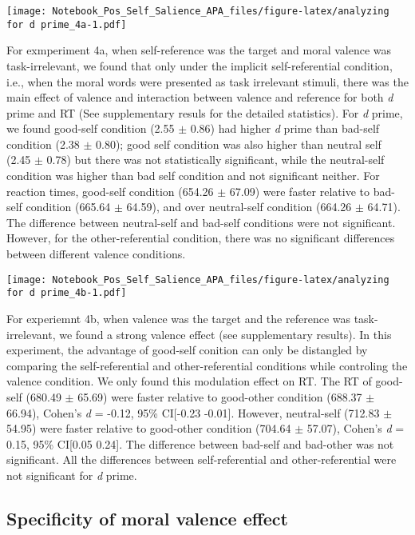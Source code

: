 \documentclass[
  man]{apa6}
\begin{document}
\texttt{[image: Notebook\_Pos\_Self\_Salience\_APA\_files/figure-latex/analyzing for d prime\_4a-1.pdf]}

For exmperiment 4a, when self-reference was the target and moral valence was task-irrelevant, we found that only under the implicit self-referential condition, i.e., when the moral words were presented as task irrelevant stimuli, there was the main effect of valence and interaction between valence and reference for both \emph{d} prime and RT (See supplementary resuls for the detailed statistics). For \emph{d} prime, we found good-self condition (2.55 \(\pm\) 0.86) had higher \emph{d} prime than bad-self condition (2.38 \(\pm\) 0.80); good self condition was also higher than neutral self (2.45 \(\pm\) 0.78) but there was not statistically significant, while the neutral-self condition was higher than bad self condition and not significant neither. For reaction times, good-self condition (654.26 \(\pm\) 67.09) were faster relative to bad-self condition (665.64 \(\pm\) 64.59), and over neutral-self condition (664.26 \(\pm\) 64.71). The difference between neutral-self and bad-self conditions were not significant. However, for the other-referential condition, there was no significant differences between different valence conditions.

\texttt{[image: Notebook\_Pos\_Self\_Salience\_APA\_files/figure-latex/analyzing for d prime\_4b-1.pdf]}

For experiemnt 4b, when valence was the target and the reference was task-irrelevant, we found a strong valence effect (see supplementary results). In this experiment, the advantage of good-self conition can only be distangled by comparing the self-referential and other-referential conditions while controling the valence condition. We only found this modulation effect on RT. The RT of good-self (680.49 \(\pm\) 65.69) were faster relative to good-other condition (688.37 \(\pm\) 66.94), Cohen's \emph{d} = -0.12, 95\% CI{[}-0.23 -0.01{]}. However, neutral-self (712.83 \(\pm\) 54.95) were faster relative to good-other condition (704.64 \(\pm\) 57.07), Cohen's \emph{d} = 0.15, 95\% CI{[}0.05 0.24{]}. The difference between bad-self and bad-other was not significant. All the differences between self-referential and other-referential were not significant for \emph{d} prime.

\hypertarget{specificity-of-moral-valence-effect}{%
\subsection{Specificity of moral valence effect}\label{specificity-of-moral-valence-effect}}
\end{document}

